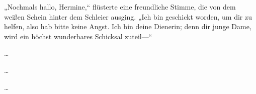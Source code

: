 „Nochmals hallo, Hermine,“ flüsterte eine freundliche Stimme, die von dem weißen Schein hinter dem Schleier ausging. „Ich bin geschickt worden, um dir zu helfen, also hab bitte keine Angst. Ich bin deine Dienerin; denn dir junge Dame, wird ein höchst wunderbares Schicksal zuteil—“

\begin{center}
…

…

…
\end{center}


